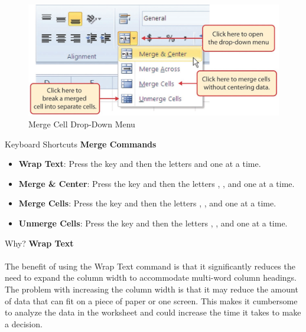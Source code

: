 \begin{figure}[H]
	\centering
	\includegraphics[width=\maxwidth{.95\linewidth}]{gfx/ch01_fig39}
	\caption{Merge Cell Drop-Down Menu}
	\label{01:fig39}
\end{figure}

\begin{center}
	\begin{shtcutbox}{Keyboard Shortcuts}
		\textbf{Merge Commands}
		\\
		\begin{itemize}
			\setlength{\itemsep}{0pt}
			\setlength{\parskip}{0pt}
			\setlength{\parsep}{0pt}
			
			\item \textbf{Wrap Text}: Press the  key and then the letters  and  one at a time.
			\item \textbf{Merge \& Center}: Press the  key and then the letters , , and  one at a time.
			\item \textbf{Merge Cells}: Press the  key and then the letters , , and  one at a time.
			\item \textbf{Unmerge Cells}: Press the  key and then the letters , , and  one at a time.
			
		\end{itemize}
	\end{shtcutbox}
\end{center}

\begin{center}
	\begin{infobox}{Why?}
		\textbf{Wrap Text}
		\\
		\\
		The benefit of using the Wrap Text command is that it significantly reduces the need to expand the column width to accommodate multi-word column headings. The problem with increasing the column width is that it may reduce the amount of data that can fit on a piece of paper or one screen. This makes it cumbersome to analyze the data in the worksheet and could increase the time it takes to make a decision.
	\end{infobox}
\end{center}

